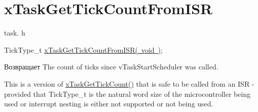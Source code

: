 \hypertarget{group__x_task_get_tick_count_from_i_s_r}{}\section{x\+Task\+Get\+Tick\+Count\+From\+I\+SR}
\label{group__x_task_get_tick_count_from_i_s_r}
task. h 
\begin{DoxyPre}TickType\_t \mbox{\hyperlink{task_8h_a092be3fd5752625303c307620be523ff}{xTaskGetTickCountFromISR( void )}};\end{DoxyPre}


\begin{DoxyReturn}{Возвращает}
The count of ticks since v\+Task\+Start\+Scheduler was called.
\end{DoxyReturn}
This is a version of \mbox{\hyperlink{task_8h_a753ecfe23e7386066ecccad5d16422f7}{x\+Task\+Get\+Tick\+Count()}} that is safe to be called from an I\+SR -\/ provided that Tick\+Type\+\_\+t is the natural word size of the microcontroller being used or interrupt nesting is either not supported or not being used. 